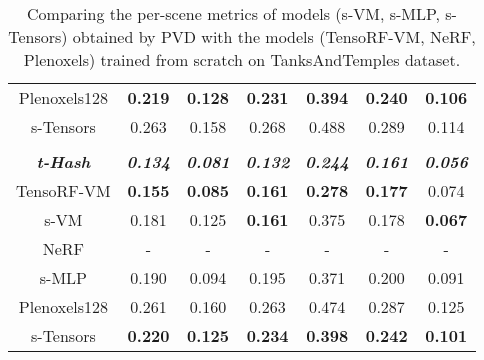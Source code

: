 \documentclass[letterpaper]{article} \usepackage{aaai23}  \usepackage{times}  \usepackage{helvet}  \usepackage{courier}  \usepackage[hyphens]{url}  \usepackage{graphicx} \urlstyle{rm} \def\UrlFont{\rm}  \usepackage{natbib}  \usepackage{caption} \frenchspacing  \setlength{\pdfpagewidth}{8.5in}  \setlength{\pdfpageheight}{11in}  \usepackage{multirow}
\begin{document}
\begin{table*}[t]
{\begin{tabular}{c|cccccc}
Plenoxels128             & \textbf{0.219}          & \textbf{0.128}          & \textbf{0.231}          & \textbf{0.394}          & \textbf{0.240}          & \textbf{0.106}          \\
s-Tensors                & 0.263                   & 0.158                   & 0.268                   & 0.488                   & 0.289                   & 0.114                   \\ \hline
                         & \multicolumn{6}{c}{}                                                                                                                             \\ \hline
\textit{\textbf{t-Hash}} & \textit{\textbf{0.134}} & \textit{\textbf{0.081}} & \textit{\textbf{0.132}} & \textit{\textbf{0.244}} & \textit{\textbf{0.161}} & \textit{\textbf{0.056}} \\
TensoRF-VM               & \textbf{0.155}          & \textbf{0.085}          & \textbf{0.161}          & \textbf{0.278}          & \textbf{0.177}          & 0.074                   \\
s-VM                     & 0.181                   & 0.125                   & \textbf{0.161}          & 0.375                   & 0.178                   & \textbf{0.067}          \\
NeRF                     & -                       & -                       & -                       & -                       & -                       & -                       \\
s-MLP                    & 0.190                   & 0.094                   & 0.195                   & 0.371                   & 0.200                   & 0.091                   \\
Plenoxels128             & 0.261                   & 0.160                   & 0.263                   & 0.474                   & 0.287                   & 0.125                   \\
s-Tensors                & \textbf{0.220}          & \textbf{0.125}          & \textbf{0.234}          & \textbf{0.398}          & \textbf{0.242}          & \textbf{0.101}          \\ \hline
\end{tabular}
}
\caption{Comparing the per-scene metrics of models (s-VM, s-MLP, s-Tensors) obtained by PVD with the models (TensoRF-VM, NeRF, Plenoxels) trained from scratch on TanksAndTemples dataset.}
\label{tab-gp2others-tanks}
\end{table*}
\end{document}
